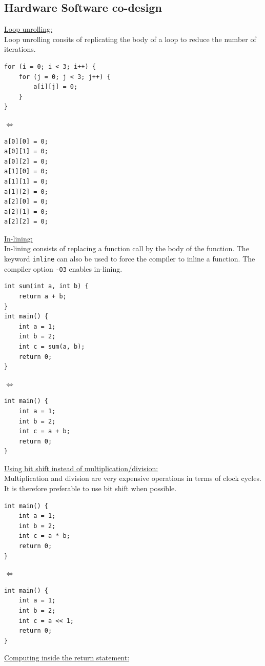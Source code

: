 \subsection*{Hardware Software co-design}
\underline{Loop unrolling:}\\
Loop unrolling consits of replicating the body of a loop to reduce the number of iterations.

\begin{minipage}{0.69\columnwidth}
    \begin{verbatim}
for (i = 0; i < 3; i++) {
    for (j = 0; j < 3; j++) {
        a[i][j] = 0;
    }
}
\end{verbatim}
\end{minipage}
$\Longleftrightarrow $
\begin{minipage}{0.29\columnwidth}
    \begin{verbatim}
a[0][0] = 0;
a[0][1] = 0;
a[0][2] = 0;
a[1][0] = 0;
a[1][1] = 0;
a[1][2] = 0;
a[2][0] = 0;
a[2][1] = 0;
a[2][2] = 0;
\end{verbatim}
\end{minipage}

\underline{In-lining:}\\
In-lining consists of replacing a function call by the body of the function.
The keyword \texttt{inline} can also be used to force the compiler to inline a function.
The compiler option \texttt{-O3} enables in-lining.

\begin{minipage}{0.49\columnwidth}
    \begin{verbatim}
int sum(int a, int b) {
    return a + b;
}
int main() {
    int a = 1;
    int b = 2;
    int c = sum(a, b);
    return 0;
}
\end{verbatim}
\end{minipage}
$\Longleftrightarrow $
\begin{minipage}{0.49\columnwidth}
    \begin{verbatim}
int main() {
    int a = 1;
    int b = 2;
    int c = a + b;
    return 0;
}
\end{verbatim}
\end{minipage}
\underline{Using bit shift instead of multiplication/division:}\\
Multiplication and division are very expensive operations in terms of clock cycles.
It is therefore preferable to use bit shift when possible.

\begin{minipage}{0.49\columnwidth}
    \begin{verbatim}
int main() {
    int a = 1;
    int b = 2;
    int c = a * b;
    return 0;
}
\end{verbatim}
\end{minipage}
$\Longleftrightarrow $
\begin{minipage}{0.49\columnwidth}
    \begin{verbatim}
int main() {
    int a = 1;
    int b = 2;
    int c = a << 1;
    return 0;
}
\end{verbatim}
\end{minipage}
\underline{Computing inside the return statement:}\\

